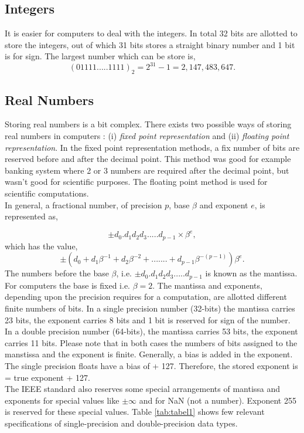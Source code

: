 \documentclass[a4,12pt]{article}
\numberwithin{equation}{subsection}
\begin{document}
 \subsection{Integers}
 It is easier for computers to deal with the integers. In total 32 bits are allotted to store the integers, out of which 31 bits stores a straight binary number and 1 bit is for sign. The largest number which can be store is,
 $$(01111.....1111)_2 = 2^{31}-1 = 2,147,483,647.$$ 

 \subsection{Real Numbers}
 Storing real numbers is a bit complex. There exists two possible ways of storing real numbers in computers : (i) \textit{fixed point representation} and (ii) \textit{floating point representation}. In the fixed point representation methods, a fix number of bits are reserved before and after the decimal point. This method was good for example banking system where 2 or 3 numbers are required after the decimal point, but wasn't good for scientific purposes. The floating point method is used for scientific computations. \\
 \newline
 In general, a fractional number, of precision $p$, base $\beta$ and exponent $e$, is represented as, 

 $$\pm d_0.d_1d_2d_3.....d_{p-1} \times \beta^e,$$
 which has the value,
 $$\pm (d_0 + d_1 \beta^{-1} + d_2 \beta^{-2}+.......+ d_{p-1} \beta^{-(p-1)})\beta^e.$$
 The numbers before the base $\beta$, i.e. $\pm d_0.d_1d_2d_3.....d_{p-1}$  is known as the mantissa. For computers the base is fixed i.e. $\beta=2$. The mantissa and exponents, depending upon the precision requires for a computation, are allotted different finite numbers of bits. In a single precision number (32-bits) the mantissa carries 23 bits, the exponent carries 8 bits and 1 bit is reserved for sign of the number. In a double precision number (64-bits), the mantissa carries 53 bits, the exponent carries 11 bits. Please note that in both cases the numbers of bits assigned to the manstissa and the exponent is finite. Generally, a bias is added in the exponent. The single precision floats have a bias of + 127. Therefore, the stored exponent is = true exponent + 127.\\
 \newline
 The IEEE standard also reserves some special arrangements of mantissa and exponents for special values like $\pm \infty$ and for NaN (not a number). Exponent 255 is reserved for these special values. Table \ref{tab:tabel1} shows few relevant specifications of single-precision and double-precision data types.
\end{document}
